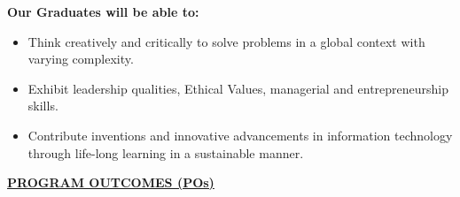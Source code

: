 \documentclass[a4paper,12pt]{report}
\begin{document}
\noindent \textbf{Our Graduates will be able to:}
\begin{itemize}[leftmargin=2.5cm]
    \item[\textbf{PEO1:}] Think creatively and critically to solve problems in a global context with varying complexity.
    \item[\textbf{PEO2:}] Exhibit leadership qualities, Ethical Values, managerial and entrepreneurship skills.
    \item[\textbf{PEO3:}] Contribute inventions and innovative advancements in information technology through life-long learning in a sustainable manner.
\end{itemize}

\vspace{1cm}

\begin{center}
    \textbf{\underline{PROGRAM OUTCOMES (POs)}}
\end{center}
\vspace{0.5cm}
\end{document}
